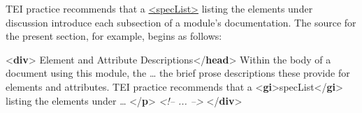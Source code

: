 TEI practice recommends that a \hyperref[TEI.specList]{<specList>} listing the elements under discussion introduce each subsection of a module's documentation. The source for the present section, for example, begins as follows: \par\bgroup{}\exampleFont \begin{shaded}\noindent\mbox{}{<\textbf{div}>}\mbox{}\newline 
{}Element and Attribute Descriptions{</\textbf{head}>}\mbox{}\newline 
{}Within the body of a document using this module, the … the brief prose descriptions these provide for elements and attributes.\mbox{}\newline 
{}\mbox{}\newline 
\hspace*{1em}\hspace*{1em}\mbox{}\newline 
\hspace*{1em}\hspace*{1em}\mbox{}\newline 
\hspace*{1em}\mbox{}\newline 
{}\mbox{}\newline 
{}TEI practice recommends that a {<\textbf{gi}>}specList{</\textbf{gi}>} listing the elements under … {</\textbf{p}>}\mbox{}\newline 
\textit{<!-- ... -->}\mbox{}\newline 
{</\textbf{div}>}\end{shaded}\egroup\par \par
